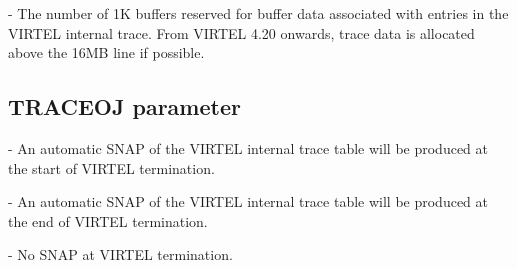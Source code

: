 \documentclass[letterpaper,10pt,english]{sphinxmanual}
\begin{document}
 - The number of 1K buffers reserved for buffer data associated with entries in the VIRTEL internal trace. From VIRTEL 4.20 onwards, trace data is allocated above the 16MB line if possible.


\subsection{TRACEOJ parameter}
\label{\detokenize{Installation_Guide:traceoj-parameter}}\label{\detokenize{Installation_Guide:index-129}}
\begin{sphinxVerbatim}[commandchars=\\\{\}]
 
\end{sphinxVerbatim}

 - An automatic SNAP of the VIRTEL internal trace table will be produced at the start of VIRTEL termination.

 - An automatic SNAP of the VIRTEL internal trace table will be produced at the end of VIRTEL termination.

 - No SNAP at VIRTEL termination.

\end{document}
